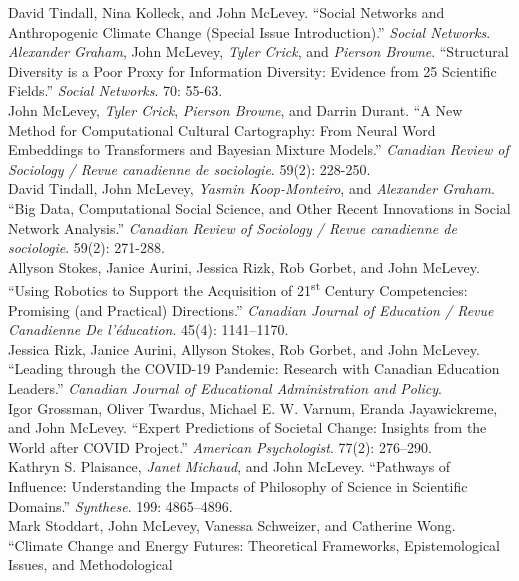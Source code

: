 \documentclass[11pt, a4paper]{article}
\newcommand{\note}[1]{\marginnote{\scriptsize #1}}
\begin{document}
\noindent
  \note{2023}David Tindall, Nina Kolleck, and John McLevey. ``Social
Networks and Anthropogenic Climate Change (Special Issue
Introduction).'' \emph{Social Networks}.  
  \\[.2cm]
  \note{2022}\emph{Alexander Graham}, John McLevey, \emph{Tyler Crick},
and \emph{Pierson Browne}. ``Structural Diversity is a Poor Proxy for
Information Diversity: Evidence from 25 Scientific
Fields.'' \emph{Social Networks}. 70: 55-63. 
  \\[.2cm]
  \note{2022}John McLevey, \emph{Tyler Crick}, \emph{Pierson Browne},
and Darrin Durant. ``A New Method for Computational Cultural
Cartography: From Neural Word Embeddings to Transformers and Bayesian
Mixture Models.'' \emph{Canadian Review of Sociology / Revue canadienne
de sociologie}. 59(2): 228-250. 
  \\[.2cm]
  \note{2022}David Tindall, John McLevey, \emph{Yasmin Koop-Monteiro},
and \emph{Alexander Graham}. ``Big Data, Computational Social Science,
and Other Recent Innovations in Social Network
Analysis.'' \emph{Canadian Review of Sociology / Revue canadienne de
sociologie}. 59(2): 271-288. 
  \\[.2cm]
  \note{2022}Allyson Stokes, Janice Aurini, Jessica Rizk, Rob Gorbet,
and John McLevey. ``Using Robotics to Support the Acquisition of
21\textsuperscript{st} Century Competencies: Promising (and Practical)
Directions.'' \emph{Canadian Journal of Education / Revue Canadienne De
l'éducation}. 45(4): 1141--1170. 
  \\[.2cm]
  \note{2022}Jessica Rizk, Janice Aurini, Allyson Stokes, Rob Gorbet,
and John McLevey. ``Leading through the COVID-19 Pandemic: Research with
Canadian Education Leaders.'' \emph{Canadian Journal of Educational
Administration and Policy}.  
  \\[.2cm]
  \note{2021}Igor Grossman, Oliver Twardus, Michael E. W. Varnum, Eranda
Jayawickreme, and John McLevey. ``Expert Predictions of Societal Change:
Insights from the World after COVID Project.'' \emph{American
Psychologist}. 77(2): 276--290. 
  \\[.2cm]
  \note{2021}Kathryn S. Plaisance, \emph{Janet Michaud}, and John
McLevey. ``Pathways of Influence: Understanding the Impacts of
Philosophy of Science in Scientific
Domains.'' \emph{Synthese}. 199: 4865--4896. 
  \\[.2cm]
  \note{2020}Mark Stoddart, John McLevey, Vanessa Schweizer, and
Catherine Wong. ``Climate Change and Energy Futures: Theoretical
Frameworks, Epistemological Issues, and Methodological
\end{document}

